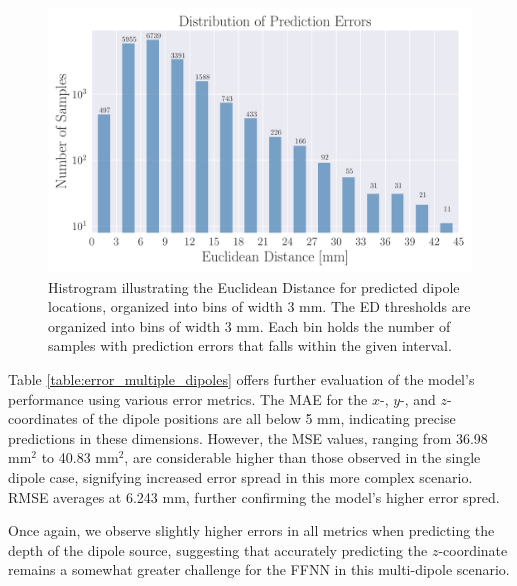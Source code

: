 \documentclass[a4paper, UKenglish, 11pt]{uiomaster}
\begin{document}
\begin{figure}[!htb]
    \centering
    \includegraphics[width=\linewidth]{figures/NN_two_dipole/new_histogram_2_dipoles_position_amplitude.pdf}
    \caption{Histrogram illustrating the Euclidean Distance for predicted dipole locations, organized into bins of width 3 mm. The ED thresholds are organized into bins of width 3 mm. Each bin holds the number of samples with prediction errors that falls within the given interval. }
    \label{fig:two_dipole_result_hist}
\end{figure}

Table \ref{table:error_multiple_dipoles} offers further evaluation of the model's performance using various error metrics. The MAE for the $x$-, $y$-, and $z$-coordinates of the dipole positions are all below 5 mm, indicating precise predictions in these dimensions. However, the MSE values, ranging from 36.98 mm$^2$ to 40.83 mm$^2$, are considerable higher than those observed in the single dipole case, signifying increased error spread in this more complex scenario. RMSE averages at 6.243 mm, further confirming the model's higher error spred.

Once again, we observe slightly higher errors in all metrics when predicting the depth of the dipole source, suggesting that accurately predicting the $z$-coordinate remains a somewhat greater challenge for the FFNN in this multi-dipole scenario.
\end{document}

